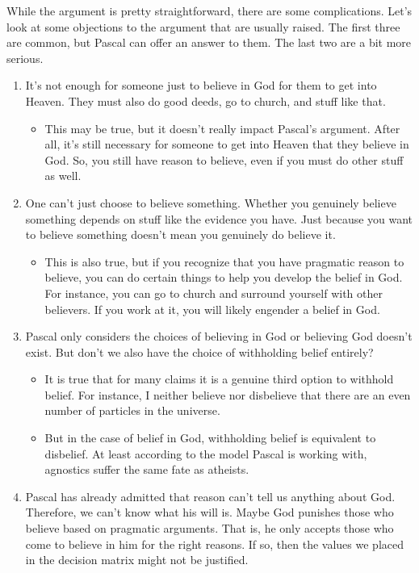 While the argument is pretty straightforward, there are some complications.  Let's look at some objections to the argument that are usually raised.  The first three are common, but Pascal can offer an answer to them.  The last two are a bit more serious.

\begin{enumerate}
 \item It's not enough for someone just to believe in God for them to get into Heaven.  They must also do good deeds, go to church, and stuff like that.
 \begin{itemize}
  \item This may be true, but it doesn't really impact Pascal's argument.  After all, it's still necessary for someone to get into Heaven that they believe in God. So, you still have reason to believe, even if you must do other stuff as well.
 \end{itemize}
 \item One can't just choose to believe something.  Whether you genuinely believe something depends on stuff like the evidence you have. Just because you want to believe something doesn't mean you genuinely do believe it.
 \begin{itemize}
  \item This is also true, but if you recognize that you have pragmatic reason to believe, you can do certain things to help you develop the belief in God.  For instance, you can go to church and surround yourself with other believers.  If you work at it, you will likely engender a belief in God.
 \end{itemize}
 \item Pascal only considers the choices of believing in God or believing God doesn't exist. But don't we also have the choice of withholding belief entirely?
 \begin{itemize}
  \item It is true that for many claims it is a genuine third option to withhold belief. For instance, I neither believe nor disbelieve that there are an even number of particles in the universe.
  \item But in the case of belief in God, withholding belief is equivalent to disbelief.  At least according to the model Pascal is working with, agnostics suffer the same fate as atheists.
 \end{itemize}

 \item Pascal has already admitted that reason can't tell us anything about God.  Therefore, we can't know what his will is.  Maybe God punishes those who believe based on pragmatic arguments.  That is, he only accepts those who come to believe in him for the right reasons.  If so, then the values we placed in the decision matrix might not be justified.


\end{enumerate}
